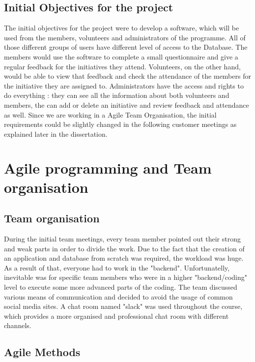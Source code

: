 \documentclass{l3proj}
\begin{document}
\subsection{Initial Objectives for the project}
\label{objectives}

The initial objectives for the project were to develop a software, which will be used from the members, volunteers and administrators of the programme. All of those different groups of users have different level of access to the Database. The members would use the software to  complete a small questionnaire and give a regular feedback for the initiatives they attend. Volunteers, on the other hand, would be able to view that feedback and check the attendance of the members for the initiative they are assigned to. Administrators have the access and rights to do everything : they can see all the information about both volunteers and members, the can add or delete an initiative and review feedback and attendance as well. Since we are working in a Agile Team Organisation, the initial requirements could be slightly changed in the following customer meetings as explained later in the dissertation.

\section{Agile programming and Team organisation}

\subsection{Team organisation}
\label{organisation}

During the initial team meetings, every team member pointed out their strong and weak parts in order to divide the work. Due to the fact that the creation of an application and database from scratch was required, the workload was huge. As a result of that, everyone had to work in the "backend". Unfortunatelly, inevitable was for specific team members who were in a higher "backend/coding" level to execute some more advanced parts of the coding.
The team discussed various means of communication and decided to avoid the usage of common social media sites. A chat room named "slack" was used throughout the course, which provides a more organised and professional chat room with different channels.

\subsection{Agile Methods}
\label{agile}
\end{document}
